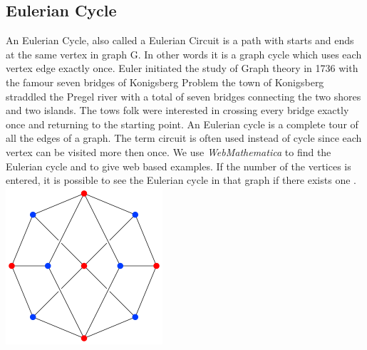 \documentclass{article}
\begin{document}
 \subsection{Eulerian Cycle}
 An Eulerian Cycle, also called a Eulerian Circuit is a path with starts and ends at the same vertex in graph G. In other words it is a graph cycle which uses each vertex edge exactly once. \hfill \break
 Euler initiated the study of Graph theory in 1736 with the famour seven bridges of Konigsberg Problem the town of Konigsberg straddled the Pregel river with a total of seven bridges connecting the two shores and two islands.
 The tows folk were interested in crossing every bridge exactly once and returning to the starting point. \hfill \break
 An Eulerian cycle is a complete tour of all the edges of a graph. The term circuit is often used instead of cycle since each vertex can be visited more then once. \hfill \break
 We use \textit{WebMathematica} to find the Eulerian cycle and to give web based examples. If the number of the vertices is entered, it is possible to see the Eulerian cycle in that graph if there exists one \cite{4}. \hfill \break
\includegraphics{euleriancyclegraphs}
 \hfill \break
 
\end{document}
